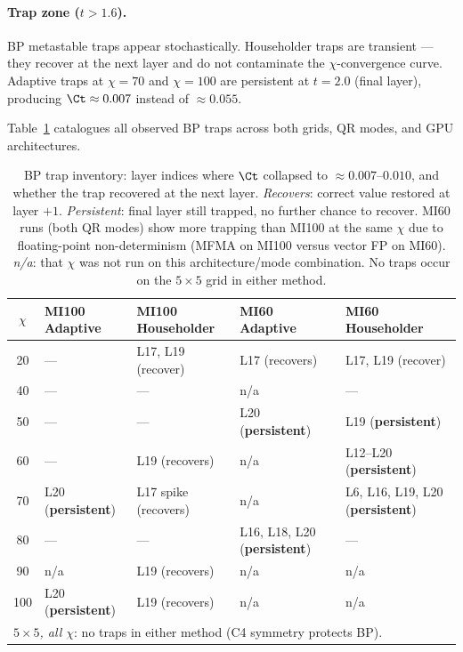 \paragraph{Trap zone ($t > 1.6$).}
BP metastable traps appear stochastically.
Householder traps are transient --- they recover at the next layer and do not
contaminate the $\chi$-convergence curve.
Adaptive traps at $\chi=70$ and $\chi=100$ are persistent at $t=2.0$
(final layer), producing $\Ct \approx 0.007$ instead of $\approx 0.055$.

Table~\ref{tab:trap_inventory} catalogues all observed BP traps across both
grids, QR modes, and GPU architectures.

\begin{table}[ht]
\centering
\caption{BP trap inventory: layer indices where $\Ct$ collapsed to
  $\approx 0.007$--$0.010$, and whether the trap recovered at the next layer.
  \emph{Recovers}: correct value restored at layer $+1$.
  \emph{Persistent}: final layer still trapped, no further chance to recover.
  MI60 runs (both QR modes) show more trapping than MI100 at the same $\chi$ due to
  floating-point non-determinism (MFMA on MI100 versus vector FP on MI60).
  \emph{n/a}: that $\chi$ was not run on this architecture/mode combination.
  No traps occur on the $5\times5$ grid in either method.}
\label{tab:trap_inventory}
\small
\begin{tabular}{cllll}
\toprule
$\chi$ & MI100 Adaptive & MI100 Householder & MI60 Adaptive & MI60 Householder \\
\midrule
20  & ---                       & L17, L19 (recover)   & L17 (recovers)                       & L17, L19 (recover)                      \\
40  & ---                       & ---                  & n/a                                  & ---                                     \\
50  & ---                       & ---                  & L20 (\textbf{persistent})            & L19 (\textbf{persistent})               \\
60  & ---                       & L19 (recovers)       & n/a                                  & L12--L20 (\textbf{persistent})          \\
70  & L20 (\textbf{persistent}) & L17 spike (recovers) & n/a                                  & L6, L16, L19, L20 (\textbf{persistent}) \\
80  & ---                       & ---                  & L16, L18, L20 (\textbf{persistent})  & ---                                     \\
90  & n/a                       & L19 (recovers)       & n/a                                  & n/a                                     \\
100 & L20 (\textbf{persistent}) & L19 (recovers)       & n/a                                  & n/a                                     \\
\midrule
\multicolumn{5}{l}{\emph{$5\times5$, all $\chi$}: no traps in either method (C4 symmetry protects BP).} \\
\bottomrule
\end{tabular}
\end{table}


